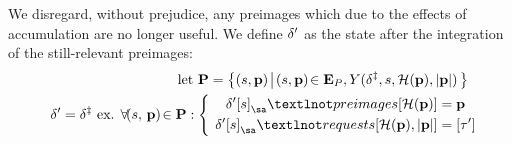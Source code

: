 We disregard, without prejudice, any preimages which due to the effects of accumulation are no longer useful. We define $\delta'$ as the state after the integration of the still-relevant preimages:
\begin{align}
  \using \mathbf{P} = \set{\build{
    \tup{s, \mathbf{p}}
  }{
    \tup{s, \mathbf{p}} \in \xtpreimages, Y(\accountspostxfer, s, \blake(\mathbf{p}), \len{\mathbf{p}})
  }}\\
  \accountspostpreimage = \accountspostxfer \text{ ex. } \forall \tup{s,\,\mathbf{p}} \in \mathbf{P} : \abracegroup[\,]{
      \quad\accountspostpreimage\subb{s}_\sa¬preimages\subb{\blake(\mathbf{p})} &= \mathbf{p} \\
      \accountspostpreimage\subb{s}_\sa¬requests\subb{\blake(\mathbf{p}), \len{\mathbf{p}}} &= \sq{\thetime'}
    }\!\!\!\!
\end{align}
